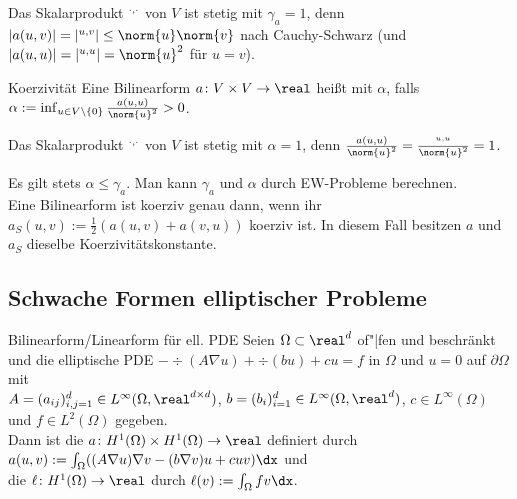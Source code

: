 \begin{Bsp}
    Das Skalarprodukt $\sp{\cdot, \cdot}$ von $V$ ist stetig mit $\gamma_a = 1$, denn
    $|a(u, v)| = |\sp{u, v}| \le \norm{u} \norm{v}$ nach Cauchy-Schwarz
    (und $|a(u, u)| = |\sp{u, u}| = \norm{u}^2$ für $u = v$).
\end{Bsp}

\linie

\begin{Def}{Koerzivität}
    Eine Bilinearform $a\colon V \times V \to \real$ heißt  mit
     $\alpha$, falls
    $\alpha := \inf_{u \in V \setminus \{0\}} \frac{a(u, u)}{\norm{u}^2} > 0$.
\end{Def}

\begin{Bsp}
    Das Skalarprodukt $\sp{\cdot, \cdot}$ von $V$ ist stetig mit $\alpha = 1$, denn
    $\frac{a(u, u)}{\norm{u}^2} = \frac{\sp{u, u}}{\norm{u}^2} = 1$.
\end{Bsp}

\linie

\begin{Bem}
    Es gilt stets $\alpha \le \gamma_a$.
    Man kann $\gamma_a$ und $\alpha$ durch EW-Probleme berechnen.\\
    Eine Bilinearform ist koerziv genau dann, wenn ihr 
    $a_S(u, v) := \frac{1}{2} (a(u, v) + a(v, u))$ koerziv ist.
    In diesem Fall besitzen $a$ und $a_S$ dieselbe Koerzivitätskonstante.
\end{Bem}

\pagebreak

\subsection{%
    Schwache Formen elliptischer Probleme%
}

\begin{Def}{Bilinearform/Linearform für ell. PDE}
    Seien $\Omega \subset \real^d$ of"|fen und beschränkt und die elliptische PDE
    $-\div(A\nabla u) + \div(bu) + cu = f$ in $\Omega$ und
    $u = 0$ auf $\partial\Omega$ mit\\
    $A = (a_{ij})_{i,j=1}^d \in L^\infty(\Omega, \real^{d \times d})$,
    $b = (b_i)_{i=1}^d \in L^\infty(\Omega, \real^d)$,
    $c \in L^\infty(\Omega)$ und
    $f \in L^2(\Omega)$ gegeben.\\
    Dann ist die
     $a\colon H^1(\Omega) \times H^1(\Omega) \to \real$
    definiert durch\\
    $a(u, v) := \int_\Omega ((A\nabla u) \nabla v - (b \nabla v) u + cuv) \dx$ und\\
    die  $\ell\colon H^1(\Omega) \to \real$ durch
    $\ell(v) := \int_\Omega fv \dx$.
\end{Def}

